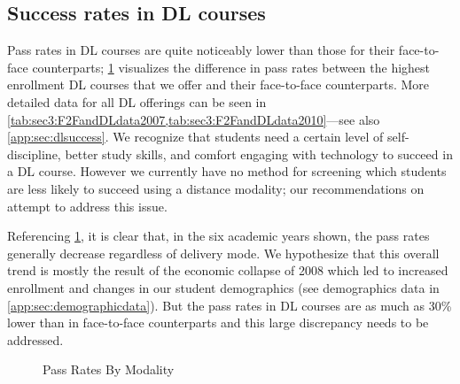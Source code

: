 \subsection{Success rates in DL courses}
Pass rates in DL courses are quite noticeably lower than those for their
face-to-face counterparts; \cref{fig:sec3:F2FandDLpassRates} visualizes the
difference in pass rates between the highest enrollment DL courses that we offer
and their face-to-face counterparts. More detailed data for all DL offerings can
be seen in \cref{tab:sec3:F2FandDLdata2007,tab:sec3:F2FandDLdata2010}---see also
\vref{app:sec:dlsuccess}. We recognize that students need a
certain level of self-discipline, better study skills, and comfort engaging with
technology to succeed in a DL course. However we currently have no method for
screening which students are less likely to succeed using a distance modality;
our recommendations on  attempt to address this issue.

Referencing \cref{fig:sec3:F2FandDLpassRates},
it is clear that, in the six academic years shown, the pass rates
generally decrease regardless of delivery mode.  We hypothesize that this
overall trend is mostly the result of the economic collapse of 2008 which led to
increased enrollment and changes in our student demographics (see demographics
data in \vref{app:sec:demographicdata}).  But the pass rates in DL courses are
as much as 30\% lower than in face-to-face counterparts and this large
discrepancy needs to be addressed.

\begin{figure}[!htb]
	\begin{widepage}
	\begin{subfigure}{.3\textwidth}
		
	\end{subfigure}%
	\begin{subfigure}{.3\textwidth}
		
	\end{subfigure}%
	\begin{subfigure}{.3\textwidth}
		
	\end{subfigure}

	\vspace{2pc}

	\begin{subfigure}{.3\textwidth}
		
	\end{subfigure}%
	\begin{subfigure}{.3\textwidth}
		
	\end{subfigure}%
	\begin{subfigure}{.3\textwidth}
		
	\end{subfigure}
	\caption{Pass Rates By Modality}
	\label{fig:sec3:F2FandDLpassRates}
	\end{widepage}
\end{figure}

